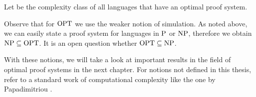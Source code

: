   \begin{definition}
    Let  be the complexity class of all languages that have an optimal proof system.
  \end{definition}

  Observe that for \(\OPT\) we use the weaker notion of simulation. As noted above, we can easily state a proof system for languages in \(\P\) or \(\NP\), therefore we obtain \(\NP \subseteq \OPT\). It is an open question whether \(\OPT \subseteq \NP\). 

  With these notions, we will take a look at important results in the field of optimal proof systems in the next chapter. For notions not defined in this thesis, refer to a standard work of computational complexity like the one by Papadimitriou \cite{Pap94}.

